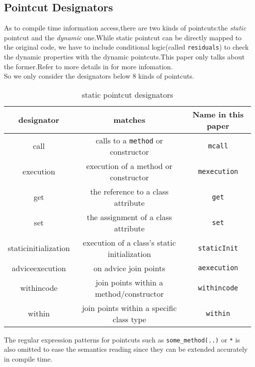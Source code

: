 \subsection{Pointcut Designators}
As to compile time information access,there are two kinds of pointcuts:the \textsl{static} pointcut and the \textsl{dynamic} one.While static pointcut can be directly mapped to the original code, we have to include conditional logic(called \texttt{residuals}) to check the dynamic properties with the dynamic pointcuts.This paper only talks about the former.Refer to more details in \cite{masterAspectj} for more infomation.\\
So we only consider the designators below 8 kinds of pointcuts.
\begin{table*}[!hbtp]
  \centering
\begin{tabular}{|c|c|c|}
\hline \textbf{designator}&\textbf{matches}&\textbf{Name in this paper}\\
\hline call&calls to a \texttt{method} or constructor& \texttt{mcall}\\
\hline execution&execution of a method or constructor& \texttt{mexecution}\\
\hline get&the reference to a class attribute&\texttt{get}\\
\hline set&the assignment of a class attribute&\texttt{set}\\
\hline staticinitialization&execution of a class's static initialization&\texttt{staticInit}\\
\hline adviceexecution&on advice join points&\texttt{aexecution}\\
\hline withincode&join points within a method/constructor&\texttt{withincode}\\
\hline within& join points within a specific class type&\texttt{within}\\
\hline
\end{tabular}
\caption{static pointcut designators}
\end{table*}
The regular expression patterns for pointcuts such as \texttt{some\_method(..)} or \texttt{*} is also omitted to ease the semantics reading since they can be extended accurately in compile time.


